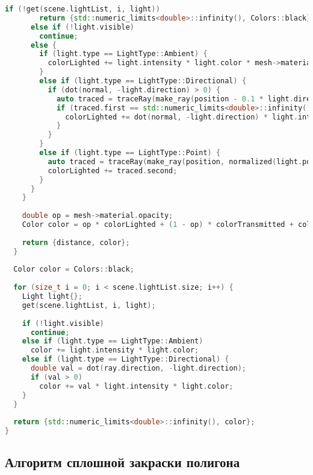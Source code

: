 \begin{lstlisting}[language=C++]
      if (!get(scene.lightList, i, light))
        return {std::numeric_limits<double>::infinity(), Colors::black};
      else if (!light.visible)
        continue;
      else {
        if (light.type == LightType::Ambient) {
          colorLighted += light.intensity * light.color * mesh->material.ambientColor;
        }
        else if (light.type == LightType::Directional) {
          if (dot(normal, -light.direction) > 0) {
            auto traced = traceRay(make_ray(position - 0.1 * light.direction, -light.direction), scene, camera, depthLeft - 1);
            if (traced.first == std::numeric_limits<double>::infinity()) {
              colorLighted += dot(normal, -light.direction) * light.intensity * light.color;
            }
          }
        }
        else if (light.type == LightType::Point) {
          auto traced = traceRay(make_ray(position, normalized(light.position - position)), scene, camera, depthLeft - 1);
          colorLighted += traced.second;
        }
      }
    }
    
    double op = mesh->material.opacity;
    Color color = op * colorLighted + (1 - op) * colorTransmitted + colorReflected;
  
    return {distance, color};
  }
  
  Color color = Colors::black;
  
  for (size_t i = 0; i < scene.lightList.size; i++) {
    Light light{};
    get(scene.lightList, i, light);
    
    if (!light.visible)
      continue;
    else if (light.type == LightType::Ambient)
      color += light.intensity * light.color;
    else if (light.type == LightType::Directional) {
      double val = dot(ray.direction, -light.direction);
      if (val > 0)
        color += val * light.intensity * light.color;
    }
  }
  
  return {std::numeric_limits<double>::infinity(), color};
}
\end{lstlisting}

\subsection{Алгоритм сплошной закраски полигона}

